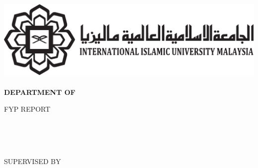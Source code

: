 \documentclass[a4paper]{memoir}
\begin{document}
\thispagestyle{empty}
\begin{LARGE}
\begin{center}
\includegraphics[scale=0.5]{../images/iium}\\[24pt]

{\fontsize{18pt}{20pt}\selectfont
  \textbf{\MakeTextUppercase{\myKulliyah}\\[24pt]}
  \textbf{\MakeTextUppercase{Department of \myDepartment}\\[12pt]}
}

{\fontsize{16pt}{18pt}\selectfont
  \MakeTextUppercase{FYP Report}\\[48pt]
  \MakeTextUppercase{\myTitle}\\
}

\vfill

{\fontsize{14pt}{16pt}\selectfont
  \MakeTextUppercase{\myName}\\
  \MakeTextUppercase{\myMatric}\\

  \vfill

  \MakeTextUppercase{Supervised by}\\[10pt]
  \MakeTextUppercase{\mySupervisor}\\

  \vfill

  \MakeTextUppercase{\myTime}\\
  \MakeTextUppercase{\mySemester}\\
}
\end{center}
\end{LARGE}
\end{document}

